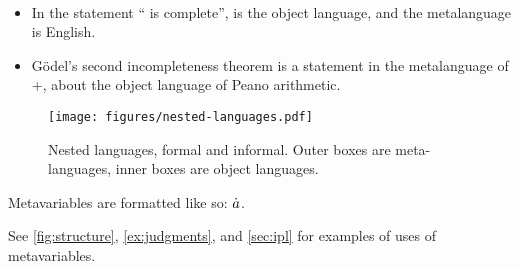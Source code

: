 \documentclass[./thesis.tex]{subfiles}
\begin{document}
\begin{example}
  \
  \begin{itemize}
    \itemsep0em
    \item In the statement ``\FOL{} is complete'', \FOL{}
      is the object language, and the metalanguage is English.
    \item G\"odel's second incompleteness theorem is a statement in the
      metalanguage of \FOL{}+\ZFC{}, about the object
      language of Peano arithmetic.
  \end{itemize}
\end{example}

\begin{figure}
  \centering
  \texttt{[image: figures/nested-languages.pdf]}
  \caption{\label{fig:nested}Nested languages, formal and informal. Outer boxes
    are meta-languages, inner boxes are object languages.}
\end{figure}


\begin{notation}
  Metavariables are formatted like so: $\dot{a}$.
\end{notation}

See \cref{fig:structure}, \cref{ex:judgments}, and \cref{sec:ipl} for examples
of uses of metavariables.

\end{document}

